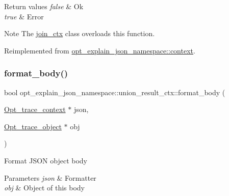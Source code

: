 \begin{DoxyRetVals}{Return values}
{\em false} & Ok \\
\hline
{\em true} & Error\\
\hline
\end{DoxyRetVals}
\begin{DoxyNote}{Note}
The {\ttfamily \mbox{\hyperlink{classopt__explain__json__namespace_1_1join__ctx}{join\+\_\+ctx}}} class overloads this function. 
\end{DoxyNote}


Reimplemented from \mbox{\hyperlink{classopt__explain__json__namespace_1_1context_a73e34a665c4550ba7725839ca643119d}{opt\+\_\+explain\+\_\+json\+\_\+namespace\+::context}}.

\mbox{\label{classopt__explain__json__namespace_1_1union__result__ctx_a530209b64dc40a9e682f78cd550b1047}} 
\subsubsection{\texorpdfstring{format\+\_\+body()}{format\_body()}}
{\footnotesize\ttfamily bool opt\+\_\+explain\+\_\+json\+\_\+namespace\+::union\+\_\+result\+\_\+ctx\+::format\+\_\+body (\begin{DoxyParamCaption}\item[{\mbox{\hyperlink{classOpt__trace__context}{Opt\+\_\+trace\+\_\+context}} $\ast$}]{json,  }\item[{\mbox{\hyperlink{classOpt__trace__object}{Opt\+\_\+trace\+\_\+object}} $\ast$}]{obj }\end{DoxyParamCaption})\hspace{0.3cm}{\ttfamily [virtual]}}

Format J\+S\+ON object body


\begin{DoxyParams}{Parameters}
{\em json} & Formatter \\
\hline
{\em obj} & Object of this body\\
\hline
\end{DoxyParams}

